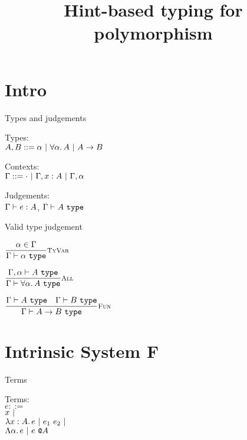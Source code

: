 \documentclass{beamer}
\title{Hint-based typing for polymorphism}
\date{}
\begin{document}
\frame{\titlepage}

\section{Intro}

\begin{frame}{Types and judgements}

Types: \\
$A, B ::= \alpha \pipe \ForallT{\alpha}{A} \pipe \Fun{A}{B}$

\vspace{1em}

Contexts: \\
$\Gamma ::= \emptytypingctx \pipe \extend{\Gamma}{x}{A} \pipe \extendtype{\Gamma}{\alpha}$

\vspace{1em}

Judgements: \\
$\typing{e}{A}$, $\type{A}$

\end{frame}

\begin{frame}{Valid type judgement}

\begin{center}
  $\infrule[TyVar]{\sidecond{\alpha \in \Gamma}}{\type{\alpha}}$

  \vspace{2em}

  $\infrule[All]{\fulltype{\extendtype{\Gamma}{\alpha}}{A}}{\type{\ForallT{\alpha}{A}}}$

  \vspace{2em}

  $\infrule[Fun]{\type{A} \quad \type{B}}{\type{\Fun{A}{B}}}$
\end{center}

\end{frame}

\section{Intrinsic System F}

\begin{frame}{Terms}

Terms: \\
$e ::=$ \\
\qquad $x \pipe $ \\
\qquad $\ifun{x}{A}{e} \pipe \app{e_1}{e_2} \pipe$ \\
\qquad $\tfun{\alpha}{e} \pipe \tapp{e}{A}$

\end{frame}
\end{document}
